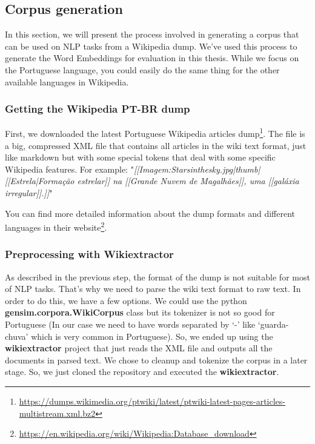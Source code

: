 \subsection{Corpus generation}\label{chap:methodsandmaterials:corpus}

In this section, we will present the process involved in generating a corpus that can be used on NLP tasks from a Wikipedia dump. We’ve used this process to generate the Word Embeddings for evaluation in this thesis. While we focus on the Portuguese language, you could easily do the same thing for the other available languages in Wikipedia.

\subsubsection{Getting the Wikipedia PT-BR dump}

First, we downloaded the latest Portuguese Wikipedia articles dump\footnote{\url{https://dumps.wikimedia.org/ptwiki/latest/ptwiki-latest-pages-articles-multistream.xml.bz2}}. The file is a big, compressed XML file that contains all articles in the wiki text format, just like markdown but with some special tokens that deal with some specific Wikipedia features. For example: "\textit{[[Imagem:Starsinthesky.jpg|thumb|[[Estrela|Formação estrelar]] na [[Grande Nuvem de Magalhães]], uma [[galáxia irregular]].]]}"


You can find more detailed information about the dump formats and different languages in their website\footnote{\url{https://en.wikipedia.org/wiki/Wikipedia:Database_download}}.

\subsubsection{Preprocessing with Wikiextractor}

As described in the previous step, the format of the dump is not suitable for most of NLP tasks. That’s why we need to parse the wiki text format to raw text. In order to do this, we have a few options. We could use the python \textbf{gensim.corpora.WikiCorpus} class but its tokenizer is not so good for Portuguese (In our case we need to have words separated by ‘-’ like ‘guarda-chuva’ which is very common in Portuguese). So, we ended up using the \textbf{wikiextractor} project that just reads the XML file and outputs all the documents in parsed text. We chose to cleanup and tokenize the corpus in a later stage. So, we just cloned the repository and executed the \textbf{wikiextractor}.

